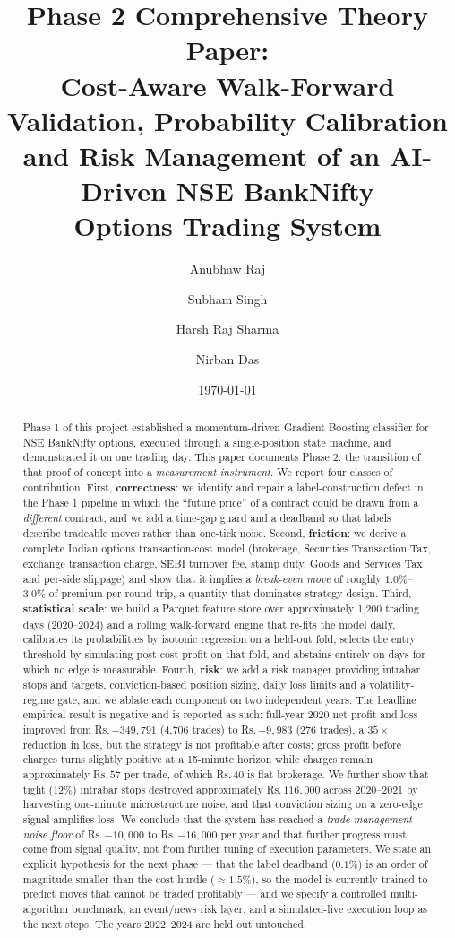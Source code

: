\documentclass[11pt,a4paper]{article}
\title{\textbf{Phase 2 Comprehensive Theory Paper:\\
Cost-Aware Walk-Forward Validation, Probability Calibration\\
and Risk Management of an AI-Driven NSE BankNifty\\
Options Trading System}}
\author{Anubhaw Raj \and Subham Singh \and Harsh Raj Sharma \and Nirban Das}
\date{\today}
\newcommand{\rs}{Rs.\,}                 %
\begin{document}
\maketitle

\begin{abstract}
Phase 1 of this project established a momentum-driven Gradient Boosting classifier for
NSE BankNifty options, executed through a single-position state machine, and demonstrated
it on one trading day. This paper documents Phase 2: the transition of that proof of
concept into a \emph{measurement instrument}. We report four classes of contribution.
First, \textbf{correctness}: we identify and repair a label-construction defect in the
Phase 1 pipeline in which the ``future price'' of a contract could be drawn from a
\emph{different} contract, and we add a time-gap guard and a deadband so that labels
describe tradeable moves rather than one-tick noise. Second, \textbf{friction}: we derive
a complete Indian options transaction-cost model (brokerage, Securities Transaction Tax,
exchange transaction charge, SEBI turnover fee, stamp duty, Goods and Services Tax and
per-side slippage) and show that it implies a \emph{break-even move} of roughly
$1.0\%$--$3.0\%$ of premium per round trip, a quantity that dominates strategy design.
Third, \textbf{statistical scale}: we build a Parquet feature store over approximately
1{,}200 trading days (2020--2024) and a rolling walk-forward engine that re-fits the
model daily, calibrates its probabilities by isotonic regression on a held-out fold,
selects the entry threshold by simulating post-cost profit on that fold, and abstains
entirely on days for which no edge is measurable. Fourth, \textbf{risk}: we add a
risk manager providing intrabar stops and targets, conviction-based position sizing,
daily loss limits and a volatility-regime gate, and we ablate each component on two
independent years. The headline empirical result is negative and is reported as such:
full-year 2020 net profit and loss improved from \rs$-349{,}791$ (4{,}706 trades) to
\rs$-9{,}983$ (276 trades), a $35\times$ reduction in loss, but the strategy is not
profitable after costs; gross profit before charges turns slightly positive at a
15-minute horizon while charges remain approximately \rs$57$ per trade, of which
\rs$40$ is flat brokerage. We further show that tight ($12\%$) intrabar stops destroyed
approximately \rs$116{,}000$ across 2020--2021 by harvesting one-minute microstructure
noise, and that conviction sizing on a zero-edge signal amplifies loss. We conclude that
the system has reached a \emph{trade-management noise floor} of \rs$-10{,}000$ to
\rs$-16{,}000$ per year and that further progress must come from signal quality, not
from further tuning of execution parameters. We state an explicit hypothesis for the
next phase --- that the label deadband ($0.1\%$) is an order of magnitude smaller than
the cost hurdle ($\approx 1.5\%$), so the model is currently trained to predict moves
that cannot be traded profitably --- and we specify a controlled multi-algorithm
benchmark, an event/news risk layer, and a simulated-live execution loop as the next
steps. The years 2022--2024 are held out untouched.
\end{abstract}
\end{document}

